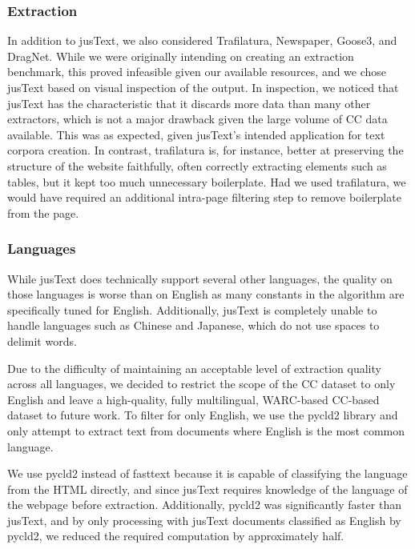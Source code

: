 \documentclass[11pt,a4paper]{article}
\begin{document}
\begin{appendices}
\subsubsection{Extraction}

In addition to jusText, we also considered Trafilatura, Newspaper, Goose3, and DragNet. While we were originally intending on creating an extraction benchmark, this proved infeasible given our available resources, and we chose jusText based on visual inspection of the output. In inspection, we noticed that jusText has the characteristic that it discards more data than many other extractors, which is not a major drawback given the large volume of CC data available. This was as expected, given jusText's intended application for text corpora creation. In contrast, trafilatura is, for instance, better at preserving the structure of the website faithfully, often correctly extracting elements such as tables, but it kept too much unnecessary boilerplate. Had we used trafilatura, we would have required an additional intra-page filtering step to remove boilerplate from the page.

\subsubsection{Languages}

While jusText does technically support several other languages, the quality on those languages is worse than on English as many constants in the algorithm are specifically tuned for English. Additionally, jusText is completely unable to handle languages such as Chinese and Japanese, which do not use spaces to delimit words.

Due to the difficulty of maintaining an acceptable level of extraction quality across all languages, we decided to restrict the scope of the CC dataset to only English and leave a high-quality, fully multilingual, WARC-based CC-based dataset to future work. To filter for only English, we use the pycld2 library and only attempt to extract text from documents where English is the most common language. 

We use pycld2 instead of fasttext because it is capable of classifying the language from the HTML directly, and since jusText requires knowledge of the language of the webpage before extraction. Additionally, pycld2 was significantly faster than jusText, and by only processing with jusText documents classified as English by pycld2, we reduced the required computation by approximately half.



\end{appendices}
\end{document}
